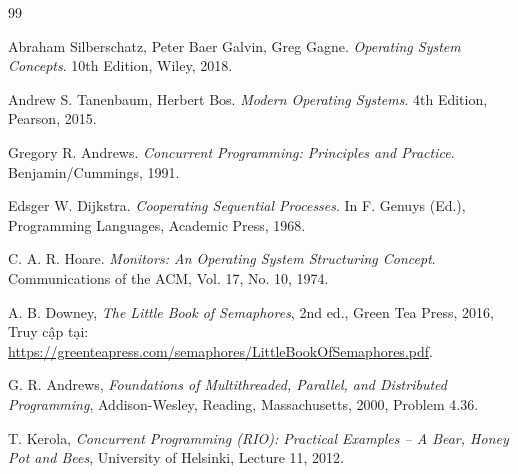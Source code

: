 \renewcommand{\bibname}{Tài liệu tham khảo}
\begin{thebibliography}{99}
\setlength{\itemsep}{0pt}
\setlength{\parsep}{0pt}
\setlength{\parskip}{0pt}

Abraham Silberschatz, Peter Baer Galvin, Greg Gagne. \textit{Operating System Concepts}. 10th Edition, Wiley, 2018.

Andrew S. Tanenbaum, Herbert Bos. \textit{Modern Operating Systems}. 4th Edition, Pearson, 2015.

Gregory R. Andrews. \textit{Concurrent Programming: Principles and Practice}. Benjamin/Cummings, 1991.

Edsger W. Dijkstra. \textit{Cooperating Sequential Processes}. In F. Genuys (Ed.), Programming Languages, Academic Press, 1968.

C. A. R. Hoare. \textit{Monitors: An Operating System Structuring Concept}. Communications of the ACM, Vol. 17, No. 10, 1974.

A. B. Downey,
\textit{The Little Book of Semaphores},
2nd ed., Green Tea Press, 2016,
Truy cập tại: \url{https://greenteapress.com/semaphores/LittleBookOfSemaphores.pdf}.

G. R. Andrews,
\textit{Foundations of Multithreaded, Parallel, and Distributed Programming},
Addison-Wesley, Reading, Massachusetts, 2000, Problem 4.36.

T. Kerola,
\textit{Concurrent Programming (RIO): Practical Examples -- A Bear,
Honey Pot and Bees},
University of Helsinki, Lecture 11, 2012.

\end{thebibliography}
